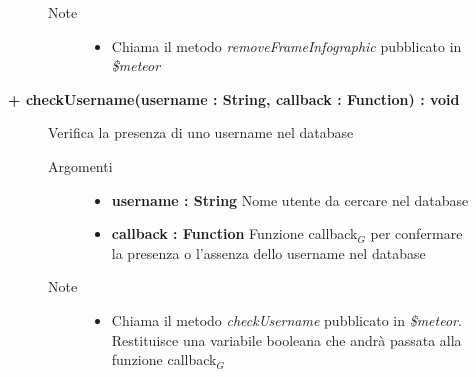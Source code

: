 \begin{description}
\begin{description}
\begin{description}
\begin{itemize}
				\end{itemize}
			\item[Note] \hfill
			\begin{itemize}
					\item Chiama il metodo \textit{removeFrameInfographic} pubblicato in \textit{\$meteor}
			\end{itemize}
		\end{description}
	\end{description}
	
	\begin{description}
		\item[\textbf{\color{blue}+ checkUsername(username : String, callback : Function) : void			}] \hfill
			Verifica la presenza di uno username nel database
			
		\begin{description}
			\item[Argomenti] \hfill
				\begin{itemize}
					\item \textbf{username : String			} \hfill
					Nome utente da cercare nel database
					\item \textbf{callback : Function			} \hfill
					Funzione callback$_G$ per confermare la presenza o l'assenza dello username nel database
					
				\end{itemize}
			\item[Note] \hfill
			\begin{itemize}
					\item Chiama il metodo \textit{checkUsername} pubblicato in \textit{\$meteor}. Restituisce una variabile booleana che andrà passata alla funzione callback$_G$
			\end{itemize}
		\end{description}
	\end{description}

\end{description}






































